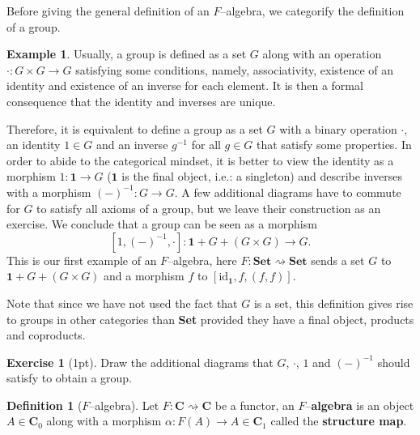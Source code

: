 \documentclass{article}
\theoremstyle{definition}
\newtheorem{defn}[thm]{Definition}
\newtheorem{exmp}[thm]{Example}
\newtheorem{exer}{Exercise}
\theoremstyle{remark}
\newcommand{\id}{\text{id}}
\begin{document}
Before giving the general definition of an $F$--algebra, we categorify the definition of a group.
\begin{exmp}\label{exmpgroup}
	Usually, a group is defined as a set $G$ along with an operation $\cdot: G\times G\rightarrow G$ satisfying some conditions, namely, associativity, existence of an identity and existence of an inverse for each element. It is then a formal consequence that the identity and inverses are unique.
	
	Therefore, it is equivalent to define a group as a set $G$ with a binary operation $\cdot$, an identity $1 \in G$ and an inverse $g^{-1}$ for all $g \in G$ that satisfy some properties. In order to abide to the categorical mindset, it is better to view the identity as a morphism $1: \mathbf{1} \rightarrow G$ ($\mathbf{1}$ is the final object, i.e.: a singleton) and describe inverses with a morphism $(-)^{-1} : G \rightarrow G$. A few additional diagrams have to commute for $G$ to satisfy all axioms of a group, but we leave their construction as an exercise. We conclude that a group can be seen as a morphism \[[1,(-)^{-1}, \cdot] : \mathbf{1} + G + (G\times G) \rightarrow G.\]
	This is our first example of an $F$--algebra, here $F:\textbf{Set}\rightsquigarrow \textbf{Set}$ sends a set $G$ to $\mathbf{1}+G+(G\times G)$ and a morphism $f$ to $[\id_{\mathbf{1}}, f, (f,f)]$.
	
	Note that since we have not used the fact that $G$ is a set, this definition gives rise to groups in other categories than \textbf{Set} provided they have a final object, products and coproducts.
\end{exmp}
\begin{exer}[1pt]
    Draw the additional diagrams that $G$, $\cdot$, $1$ and $(-)^{-1}$ should satisfy to obtain a group.
\end{exer}
\begin{defn}[$F$--algebra]
    Let $F:\mathbf{C}\rightsquigarrow \mathbf{C}$ be a functor, an $F$--\textbf{algebra} is an object $A \in \mathbf{C}_0$ along with a morphism $\alpha: F(A) \rightarrow A \in \mathbf{C}_1$ called the \textbf{structure map}.
\end{defn}
\end{document}
